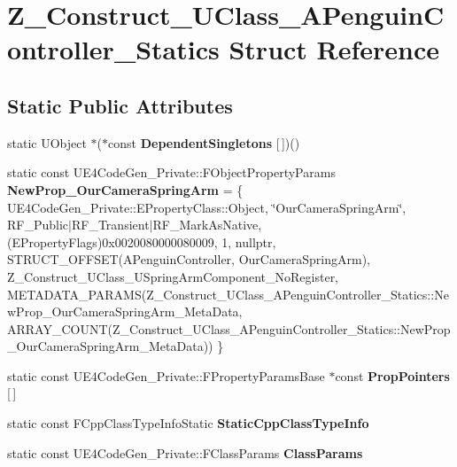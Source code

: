 \hypertarget{struct_z___construct___u_class___a_penguin_controller___statics}{}\section{Z\+\_\+\+Construct\+\_\+\+U\+Class\+\_\+\+A\+Penguin\+Controller\+\_\+\+Statics Struct Reference}
\label{struct_z___construct___u_class___a_penguin_controller___statics}
\subsection*{Static Public Attributes}
\begin{DoxyCompactItemize}
\item 
\mbox{\label{struct_z___construct___u_class___a_penguin_controller___statics_a2d00b54ef573e06fa3ff4c6926dc3587}} 
static U\+Object $\ast$($\ast$const {\bfseries Dependent\+Singletons} \mbox{[}$\,$\mbox{]})()
\item 
\mbox{\label{struct_z___construct___u_class___a_penguin_controller___statics_aad146fa0d9f304317c264bec1d9f15e4}} 
static const U\+E4\+Code\+Gen\+\_\+\+Private\+::\+F\+Object\+Property\+Params {\bfseries New\+Prop\+\_\+\+Our\+Camera\+Spring\+Arm} = \{ U\+E4\+Code\+Gen\+\_\+\+Private\+::\+E\+Property\+Class\+::\+Object, \char`\"{}Our\+Camera\+Spring\+Arm\char`\"{}, R\+F\+\_\+\+Public$\vert$R\+F\+\_\+\+Transient$\vert$R\+F\+\_\+\+Mark\+As\+Native, (E\+Property\+Flags)0x0020080000080009, 1, nullptr, S\+T\+R\+U\+C\+T\+\_\+\+O\+F\+F\+S\+E\+T(\+A\+Penguin\+Controller, Our\+Camera\+Spring\+Arm), Z\+\_\+\+Construct\+\_\+\+U\+Class\+\_\+\+U\+Spring\+Arm\+Component\+\_\+\+No\+Register, M\+E\+T\+A\+D\+A\+T\+A\+\_\+\+P\+A\+R\+A\+M\+S(\+Z\+\_\+\+Construct\+\_\+\+U\+Class\+\_\+\+A\+Penguin\+Controller\+\_\+\+Statics\+::\+New\+Prop\+\_\+\+Our\+Camera\+Spring\+Arm\+\_\+\+Meta\+Data, A\+R\+R\+A\+Y\+\_\+\+C\+O\+U\+N\+T(\+Z\+\_\+\+Construct\+\_\+\+U\+Class\+\_\+\+A\+Penguin\+Controller\+\_\+\+Statics\+::\+New\+Prop\+\_\+\+Our\+Camera\+Spring\+Arm\+\_\+\+Meta\+Data)) \}
\item 
static const U\+E4\+Code\+Gen\+\_\+\+Private\+::\+F\+Property\+Params\+Base $\ast$const {\bfseries Prop\+Pointers} \mbox{[}$\,$\mbox{]}
\item 
static const F\+Cpp\+Class\+Type\+Info\+Static {\bfseries Static\+Cpp\+Class\+Type\+Info}
\item 
static const U\+E4\+Code\+Gen\+\_\+\+Private\+::\+F\+Class\+Params {\bfseries Class\+Params}
\end{DoxyCompactItemize}


